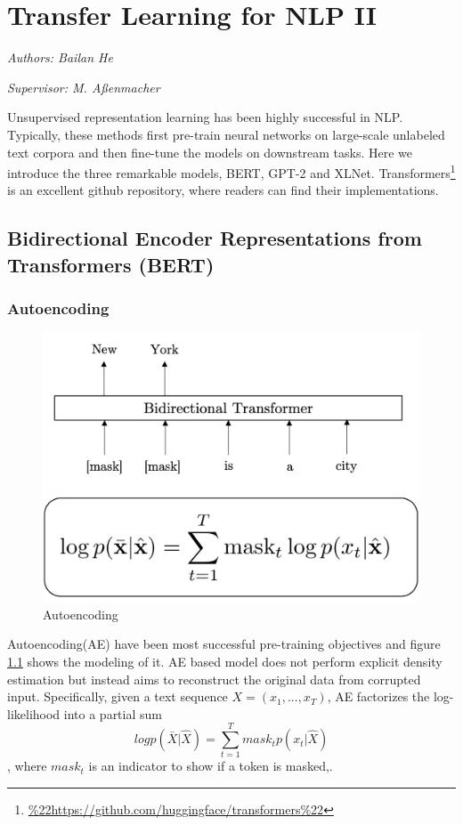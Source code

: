 \documentclass[]{krantz}
\renewcommand{\href}[2]{#2\footnote{\url{#1}}}
\begin{document}
\hypertarget{transfer-learning-for-nlp-ii}{%
\chapter{Transfer Learning for NLP II}\label{transfer-learning-for-nlp-ii}}

\emph{Authors: Bailan He}

\emph{Supervisor: M. Aßenmacher}

Unsupervised representation learning has been highly successful in NLP. Typically, these methods first pre-train neural networks on large-scale unlabeled text corpora and then fine-tune the models on downstream tasks. Here we introduce the three remarkable models, BERT, GPT-2 and XLNet. \href{\%22https://github.com/huggingface/transformers\%22}{Transformers} is an excellent github repository, where readers can find their implementations.

\hypertarget{bidirectional-encoder-representations-from-transformers-bert}{%
\section{Bidirectional Encoder Representations from Transformers (BERT)}\label{bidirectional-encoder-representations-from-transformers-bert}}

\hypertarget{autoencoding}{%
\subsection{Autoencoding}\label{autoencoding}}

\begin{figure}

{\centering \includegraphics[width=0.5\linewidth]{figures/02-03-transfer-learning-for-nlp/autoencoding} 

}

\caption{Autoencoding}\label{fig:ch02-03-figure01}
\end{figure}

Autoencoding(AE) have been most successful pre-training objectives and figure \ref{fig:ch02-03-figure01} shows the modeling of it. AE based model does not perform explicit density estimation but instead aims to reconstruct the original data from corrupted input. Specifically, given a text sequence \(X = (x_1,...,x_T)\), AE factorizes the log-likelihood into a partial sum \[log p(\bar{X}|\hat{X}) = \sum^T_{t=1} mask_t p(x_t|\hat{X})\], where \(mask_t\) is an indicator to show if a token is masked,\citet{yang2019xlnet}.
\end{document}
